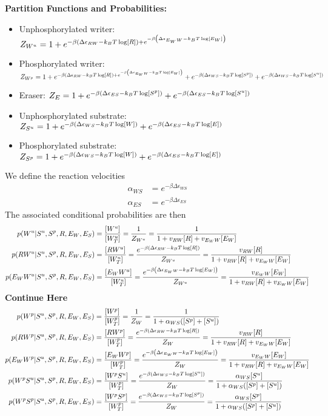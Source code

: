 \documentclass[aps,onecolumn,superscriptaddress,notitlepage]{revtex4-1}
\newcommand{\comment}[1]{{\color{blue}#1}}
\begin{document}
\textbf{Partition Functions and Probabilities:}
\begin{itemize}
\item Unphosphorylated writer: $Z_{W^u} = 1 + e^{-\beta\qty(\Delta\epsilon_{RW} -k_BT \log[R]) + e^{-\beta\qty(\Delta\epsilon_{E_WW} -k_BT \log[E_W])}}$
\item Phosphorylated writer: $Z_{W^p} = 1 + e^{-\beta\qty(\Delta\epsilon_{RW} -k_BT \log[R]) + e^{-\beta\qty(\Delta\epsilon_{E_WW} -k_BT \log[E_W])}} + e^{-\beta\qty(\Delta\epsilon_{WS} -k_BT \log[S^p])} + e^{-\beta\qty(\Delta\epsilon_{WS} -k_BT \log[S^u])}$
\item Eraser: $Z_E = 1 + e^{-\beta\qty(\Delta\epsilon_{ES} -k_BT \log[S^p])} + e^{-\beta\qty(\Delta\epsilon_{ES} -k_BT \log[S^u])}$
\item Unphosphorylated substrate: $Z_{S^u} = 1 + e^{-\beta\qty(\Delta\epsilon_{WS} -k_BT \log[W])} + e^{-\beta\qty(\Delta\epsilon_{ES} -k_BT \log[E])}$
\item Phosphorylated substrate: $Z_{S^p} = 1  + e^{-\beta\qty(\Delta\epsilon_{WS} -k_BT \log[W])} + e^{-\beta\qty(\Delta\epsilon_{ES} -k_BT \log[E])}$
\end{itemize}
We define the reaction velocities
\begin{align}
\alpha_{WS} &= e^{-\beta\Delta\epsilon_{WS}}\\
\alpha_{ES} &= e^{-\beta\Delta\epsilon_{ES}}
\end{align}
The associated conditional probabilities are then
\begin{align}
p(W^u|S^u,S^p, R, E_W, E_S) &= \frac{[W^u]}{[W^u_T]} = \frac{1}{Z_{W^u}} =  \frac{1}{1 + v_{RW}[R] + v_{E_WW}[E_W]}\\
p(RW^u|S^u,S^p, R, E_W, E_S) &= \frac{[RW^u]}{[W^u_T]}  = \frac{e^{-\beta\qty(\Delta\epsilon_{RW} -k_BT \log[R])}}{Z_{W^u}} =  \frac{v_{RW}[R]}{1 + v_{RW}[R] + v_{E_WW}[E_W]}\\
p(E_WW^u|S^u,S^p, R, E_W, E_S) &= \frac{[E_WW^u]}{[W^u_T]}  = \frac{e^{-\beta\qty(\Delta\epsilon_{E_WW} -k_BT \log[E_W])}}{Z_{W^u}} =  \frac{ v_{E_WW}[E_W]}{1 + v_{RW}[R] + v_{E_WW}[E_W]}
\end{align}
\comment{\textbf{Continue Here}}
\begin{align}
p(W^p|S^u,S^p, R, E_W, E_S) &= \frac{[W^p]}{[W^p_T]} = \frac{1}{Z_W} =  \frac{1}{1 + \alpha_{WS}([S^p]+[S^u])}\\
p(RW^p|S^u,S^p, R, E_W, E_S) &= \frac{[RW^p]}{[W^p_T]}  = \frac{e^{-\beta\qty(\Delta\epsilon_{RW} -k_BT \log[R])}}{Z_W} =  \frac{v_{RW}[R]}{1 + v_{RW}[R] + v_{E_WW}[E_W]}\\
p(E_WW^p|S^u,S^p, R, E_W, E_S) &= \frac{[E_WW^p]}{[W^p_T]}  = \frac{e^{-\beta\qty(\Delta\epsilon_{E_WW} -k_BT \log[E_W])}}{Z_W} =  \frac{ v_{E_WW}[E_W]}{1 + v_{RW}[R] + v_{E_WW}[E_W]}\\
p(W^pS^u|S^u,S^p, R, E_W, E_S) &= \frac{[W^pS^u]}{[W^p_T]}  = \frac{e^{-\beta\qty(\Delta\epsilon_{WS} -k_BT \log[S^u])}}{Z_W} =  \frac{\alpha_{WS}[S^u]}{1 + \alpha_{WS}([S^p]+[S^u])}\\
p(W^pS^p|S^u,S^p, R, E_W, E_S) &= \frac{[W^pS^p]}{[W^p_T]}  = \frac{e^{-\beta\qty(\Delta\epsilon_{WS} -k_BT \log[S^p])}}{Z_W} =  \frac{\alpha_{WS}[S^p]}{1 + \alpha_{WS}([S^p]+[S^u])}
\end{align}
\end{document}
